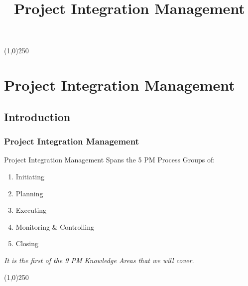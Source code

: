 

%
\title[Project Management]{Project Integration Management}
%



%

\tableofcontents
\newpage



\begin{frame}
\titlepage
\end{frame}\begin{center}\line(1,0){250}\end{center}
%
%








\section{Project Integration Management}

\subsection{Introduction}








\begin{frame}
\frametitle{Project Integration Management}
Project Integration Management Spans the 5 PM Process Groups of:
\begin{enumerate}
	\item Initiating
	\item Planning
	\item Executing
	\item Monitoring \& Controlling
	\item Closing
\end{enumerate}
\textit{It is the first of the 9 PM Knowledge Areas that we will cover.}
\end{frame}\begin{center}\line(1,0){250}\end{center}
%
%


